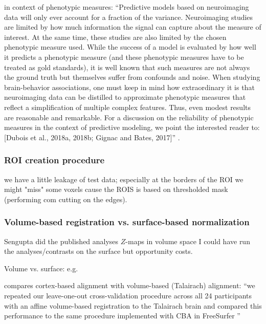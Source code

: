 %
\citet{scheinost2019ten} in context of phenotypic measures: ``Predictive models
based on neuroimaging data will only ever account for a fraction of the
variance. Neuroimaging studies are limited by how much information the signal
can capture about the measure of interest. At the same time, these studies are
also limited by the chosen phenotypic measure used.  While the success of a
model is evaluated by how well it predicts a phenotypic measure (and these
phenotypic measures have to be treated as gold standards), it is well known that
such measures are not always the ground truth but themselves suffer from
confounds and noise.  When studying brain-behavior associations, one must keep
in mind how extraordinary it is that neuroimaging data can be distilled to
approximate phenotypic measures that reflect a simplification of multiple
complex features. Thus, even modest results are reasonable and remarkable. For a
discussion on the reliability of phenotypic measures in the context of
predictive modeling, we point the interested reader to: [Dubois et al., 2018a,
2018b; Gignac and Bates, 2017]'' \citep{scheinost2019ten}.


\subsubsection{ROI creation procedure}

we have a little leakage of test data; especially at the borders of the ROI we
might "miss" some voxels cause the ROIS is based on thresholded mask (performing
com cutting on the edges).



\subsubsection{Volume-based registration vs. surface-based normalization}

%
Sengupta did the published analyses $Z$-maps in volume space
%
I could have run the analyses/contrasts on the surface but opportunity costs.
%

Volume vs. surface: e.g. \citep{desai2005volumetric}

\citep{weiner2018defining} compares cortex-based alignment
\citep{fischl1999high} with volume-based (Talairach) alignment: ``we repeated
our leave-one-out cross-validation procedure across all 24 participants with an
affine volume-based registration to the Talairach brain and compared this
performance to the same procedure implemented with CBA in FreeSurfer
\citep{weiner2018defining}''




